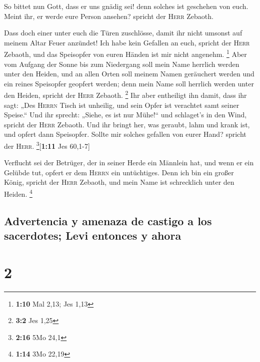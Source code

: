  So bittet nun Gott, dass er uns gnädig sei! denn solches
ist geschehen von euch. Meint ihr, er werde eure Person ansehen? spricht
der \textsc{Herr} Zebaoth.

 Dass doch einer unter euch die Türen zuschlösse, damit
ihr nicht umsonst auf meinem Altar Feuer anzündet! Ich habe kein
Gefallen an euch, spricht der \textsc{Herr} Zebaoth, und das Speisopfer
von euren Händen ist mir nicht angenehm. \footnote{\textbf{1:10} Mal
  2,13; Jes 1,13}  Aber vom Aufgang der Sonne bis zum
Niedergang soll mein Name herrlich werden unter den Heiden, und an allen
Orten soll meinem Namen geräuchert werden und ein reines Speisopfer
geopfert werden; denn mein Name soll herrlich werden unter den Heiden,
spricht der \textsc{Herr} Zebaoth. \footnote{\textbf{3:2} Jes 1,25}
 Ihr aber entheiligt ihn damit, dass ihr sagt: „Des
\textsc{Herrn} Tisch ist unheilig, und sein Opfer ist verachtet samt
seiner Speise.``  Und ihr sprecht: „Siehe, es ist nur
Mühe!{}`` und schlaget's in den Wind, spricht der \textsc{Herr} Zebaoth.
Und ihr bringt her, was geraubt, lahm und krank ist, und opfert dann
Speisopfer. Sollte mir solches gefallen von eurer Hand? spricht der
\textsc{Herr}. \footnote{\textbf{2:16} 5Mo 24,1}{[}\textbf{1:11} Jes
60,1-7{]}

 Verflucht sei der Betrüger, der in seiner Herde ein
Männlein hat, und wenn er ein Gelübde tut, opfert er dem \textsc{Herrn}
ein untüchtiges. Denn ich bin ein großer König, spricht der
\textsc{Herr} Zebaoth, und mein Name ist schrecklich unter den Heiden.
\footnote{\textbf{1:14} 3Mo 22,19}

\hypertarget{advertencia-y-amenaza-de-castigo-a-los-sacerdotes-levi-entonces-y-ahora}{%
\subsection{Advertencia y amenaza de castigo a los sacerdotes; Levi
entonces y
ahora}\label{advertencia-y-amenaza-de-castigo-a-los-sacerdotes-levi-entonces-y-ahora}}

\hypertarget{section-1}{%
\section{2}\label{section-1}}

